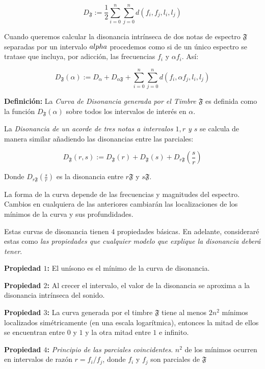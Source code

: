 \documentclass[11pt,a4paper]{article}
\begin{document}
    $$
        D_{\mathfrak{F}} := \frac{1}{2} \sum_{i = 0}^{n}{ \sum_{j = 0}^{n}{ d(f_i, f_j, l_i, l_j) } } 
    $$

    Cuando queremos calcular la disonancia intrínseca de dos notas de espectro $\mathfrak{F}$ separadas por un intervalo $\\alpha$ procedemos como si de un único espectro se tratase que incluya, por adicción, las frecuencias $f_i$ y $\alpha f_i$. Así:
    
    $$ 
        D_{\mathfrak{F}} (\alpha) := D_{\alpha} + D_{\alpha \mathfrak{F}} + \sum_{i= 0}^{n} { \sum_{j= 0}^{n}{ d(f_i, \alpha f_j, l_i, l_j)}} 
    $$

    \noindent\textbf{Definición:} La \emph{Curva de Disonancia generada por el Timbre $\mathfrak{F}$} es definida como la función $D_{\mathfrak{F}}(\alpha)$ sobre todos los intervalos de interés en $\alpha$.

    La \emph{Disonancia de un acorde de tres notas a intervalos $1, r$ y $s$} se calcula de manera similar añadiendo las disonancias entre las parciales:
    
    $$ 
        D_{\mathfrak{F}}(r, s) := D_{\mathfrak{F}}(r) + D_{\mathfrak{F}}(s) + D_{r \mathfrak{F}} \left( \frac{s}{r} \right) 
    $$
    
    Donde $D_{r \mathfrak{F}}(\frac{s}{r})$ es la disonancia entre $r \mathfrak{F}$ y $s \mathfrak{F}$.

    La forma de la curva depende de las frecuencias y magnitudes del espectro. Cambios en cualquiera de las anteriores cambiarán las localizaciones de los mínimos de la curva y sus profundidades.
    
    Estas curvas de disonancia tienen $4$ propiedades básicas. En adelante, consideraré estas como \emph{las propiedades que cualquier modelo que explique la disonancia deberá tener}.
    
    
    \noindent\textbf{Propiedad $1$:} El unísono es el mínimo de la curva de disonancia.
      
    \noindent\textbf{Propiedad $2$:} Al crecer el intervalo, el valor de la disonancia se aproxima a la disonancia intrínseca del sonido.
    
    \noindent\textbf{Propiedad $3$:} La curva generada por el timbre $\mathfrak{F}$ tiene al menos $2n^2$ mínimos localizados simétricamente (en una escala logarítmica), entonces la mitad de ellos se encuentran entre $0$ y $1$ y la otra mitad entre $1$ e infinito.
    
    \noindent\textbf{Propiedad $4$:} \emph{Principio de las parciales coincidentes}. $n^2$ de los mínimos ocurren en intervalos de razón $r = f_i /f_j$, donde $f_i$ y $f_j$ son parciales de $\mathfrak{F}$
    
\end{document}
